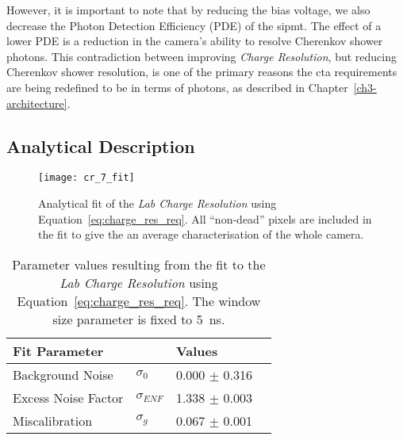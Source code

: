 However, it is important to note that by reducing the bias voltage, we also decrease the Photon Detection Efficiency (PDE) of the \gls{sipmt}. The effect of a lower PDE is a reduction in the camera's ability to resolve Cherenkov shower photons. This contradiction between improving \textit{Charge Resolution}, but reducing Cherenkov shower resolution, is one of the primary reasons the \gls{cta} requirements are being redefined to be in terms of photons, as described in Chapter~\ref{ch3-architecture}.

\subsection{Analytical Description}

\begin{figure}[H]
	\centering
    \texttt{[image: cr\_7\_fit]} 
	\caption[Analytical fit of the \textit{Lab Charge Resolution}.]{Analytical fit of the \textit{Lab Charge Resolution} using Equation~\ref{eq:charge_res_req}. All ``non-dead'' pixels are included in the fit to give the an average characterisation of the whole camera.}
	\label{fig:cr_7_fit}
\end{figure}

\begin{table}[h!]
\centering
\begin{tabular}{ll|ll} \toprule
    Fit Parameter        &                & Values             \\ \midrule
    Background Noise     & $\sigma_0$     & 0.000 $\pm$ 0.316  \\
    Excess Noise Factor  & $\sigma_{ENF}$ & 1.338 $\pm$ 0.003  \\
    Miscalibration       & $\sigma_g$     & 0.067 $\pm$ 0.001  \\ \bottomrule
\end{tabular}
\caption{Parameter values resulting from the fit to the \textit{Lab Charge Resolution} using Equation~\ref{eq:charge_res_req}. The window size parameter is fixed to \SI{5}{ns}.}
\label{table:cr_7_fit}
\end{table}

